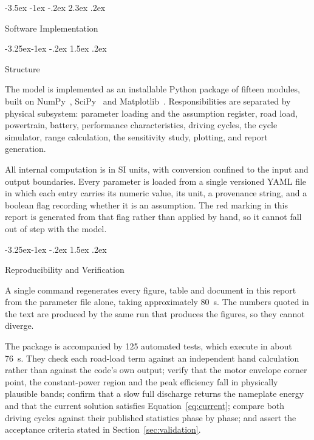 \documentclass[twocolumn]{article}
\makeatletter
\renewcommand\section{\@startsection{section}{1}{\z@}%
  {-3.5ex \@plus -1ex \@minus -.2ex}%
  {2.3ex \@plus.2ex}%
  {\raggedright\normalfont\Large\bfseries}}
\renewcommand\subsection{\@startsection{subsection}{2}{\z@}%
  {-3.25ex\@plus -1ex \@minus -.2ex}%
  {1.5ex \@plus .2ex}%
  {\raggedright\normalfont\large\bfseries}}
\makeatother
\begin{document}
\section{Software Implementation}
\label{sec:software}

\subsection{Structure}

The model is implemented as an installable Python package of fifteen modules,
built on NumPy~\cite{harris2020numpy}, SciPy~\cite{virtanen2020scipy} and
Matplotlib~\cite{hunter2007matplotlib}. Responsibilities are separated by
physical subsystem: parameter loading and the assumption register, road load,
powertrain, battery, performance characteristics, driving cycles, the cycle
simulator, range calculation, the sensitivity study, plotting, and report
generation.

All internal computation is in SI units, with conversion confined to the
input and output boundaries. Every parameter is loaded from a single versioned
YAML file in which each entry carries its numeric value, its unit, a provenance
string, and a boolean flag recording whether it is an assumption. The red
marking in this report is generated from that flag rather than applied by hand,
so it cannot fall out of step with the model.

\subsection{Reproducibility and Verification}

A single command regenerates every figure, table and document in this report
from the parameter file alone, taking approximately \SI{80}{\second}. The
numbers quoted in the text are produced by the same run that produces the
figures, so they cannot diverge.

The package is accompanied by 125 automated tests, which execute in about
\SI{76}{\second}. They check each road-load term against an independent hand
calculation rather than against the code's own output; verify that the motor
envelope corner point, the constant-power region and the peak efficiency fall
in physically plausible bands; confirm that a slow full discharge returns the
nameplate energy and that the current solution satisfies
Equation~\ref{eq:current}; compare both driving cycles against their published
statistics phase by phase; and assert the acceptance criteria stated in
Section~\ref{sec:validation}.
\end{document}
